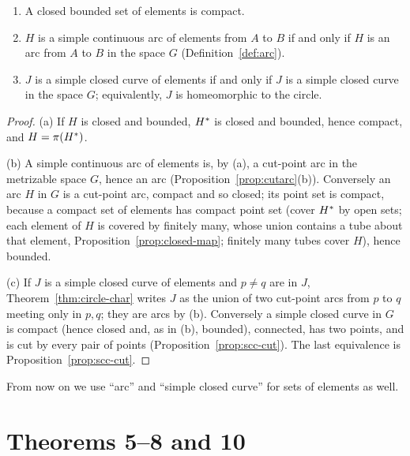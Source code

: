 \begin{proposition}\label{prop:arc-elt-top}
\leavevmode
\begin{enumerate}[label=(\alph*)]
\item A closed bounded set of elements is compact.
\item $H$ is a simple continuous arc of elements from $A$ to $B$ if and only if $H$ is an arc from $A$
to $B$ in the space $G$ (Definition~\ref{def:arc}).
\item $J$ is a simple closed curve of elements if and only if $J$ is a simple closed curve in the
space $G$; equivalently, $J$ is homeomorphic to the circle.
\end{enumerate}
\end{proposition}

\begin{proof}
(a) If $H$ is closed and bounded, $H^{\ast}$ is closed and bounded, hence compact, and $H=\pi(H^{\ast})$.

(b) A simple continuous arc of elements is, by (a), a cut-point arc in the metrizable space $G$, hence
an arc (Proposition~\ref{prop:cutarc}(b)). Conversely an arc $H$ in $G$ is a cut-point arc, compact and
so closed; its point set is compact, because a compact set of elements has compact point set (cover
$H^{\ast}$ by open sets; each element of $H$ is covered by finitely many, whose union contains a tube
about that element, Proposition~\ref{prop:closed-map}; finitely many tubes cover $H$), hence bounded.

(c) If $J$ is a simple closed curve of elements and $p\ne q$ are in $J$, Theorem~\ref{thm:circle-char}
writes $J$ as the union of two cut-point arcs from $p$ to $q$ meeting only in $p,q$; they are arcs by
(b). Conversely a simple closed curve in $G$ is compact (hence closed and, as in (b), bounded),
connected, has two points, and is cut by every pair of points (Proposition~\ref{prop:scc-cut}). The
last equivalence is Proposition~\ref{prop:scc-cut}.
\end{proof}


From now on we use ``arc'' and ``simple closed curve'' for sets of elements as well.

\section{Theorems 5--8 and 10}

